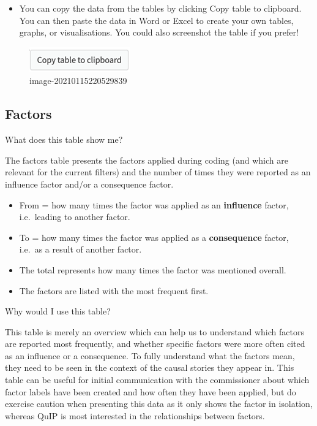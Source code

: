 \documentclass[
]{book}
\providecommand{\tightlist}{%
  \setlength{\itemsep}{0pt}\setlength{\parskip}{0pt}}
\begin{document}
\begin{itemize}
\tightlist
\item
  You can copy the data from the tables by clicking Copy table to clipboard. You can then paste the data in Word or Excel to create your own tables, graphs, or visualisations. You could also screenshot the table if you prefer!
\end{itemize}

\begin{figure}
\centering
\includegraphics{_assets/image-20210115220529839.png}
\caption{image-20210115220529839}
\end{figure}

\hypertarget{factors}{%
\subsection{Factors}\label{factors}}

What does this table show me?

The factors table presents the factors applied during coding (and which are relevant for the current filters) and the number of times they were reported as an influence factor and/or a consequence factor.

\begin{itemize}
\item
  From = how many times the factor was applied as an \textbf{influence} factor, i.e.~leading to another factor.
\item
  To = how many times the factor was applied as a \textbf{consequence} factor, i.e.~as a result of another factor.
\item
  The total represents how many times the factor was mentioned overall.
\item
  The factors are listed with the most frequent first.
\end{itemize}

Why would I use this table?

This table is merely an overview which can help us to understand which factors are reported most frequently, and whether specific factors were more often cited as an influence or a consequence. To fully understand what the factors mean, they need to be seen in the context of the causal stories they appear in. This table can be useful for initial communication with the commissioner about which factor labels have been created and how often they have been applied, but do exercise caution when presenting this data as it only shows the factor in isolation, whereas QuIP is most interested in the relationships between factors.
\end{document}
